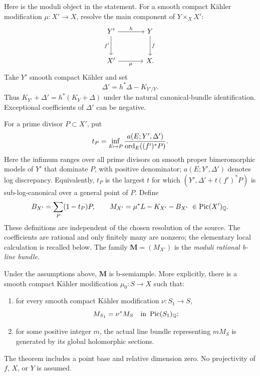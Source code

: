 Here is the moduli object in the statement.
For a smooth compact K\"ahler modification \(\mu:X'\to X\), resolve
the main component of \(Y\times_X X'\):
\[
\begin{tikzcd}[column sep=large,row sep=large]
 Y' \arrow[r,"h"] \arrow[d,"f'"'] & Y\arrow[d,"f"]\\
 X' \arrow[r,"\mu"'] & X .
\end{tikzcd}
\]
Take \(Y'\) smooth compact K\"ahler and set
\[
 \Delta'=h^*\Delta-K_{Y'/Y}.
\]
Thus \(K_{Y'}+\Delta'=h^*(K_Y+\Delta)\) under the natural
canonical-bundle identification. Exceptional coefficients of
\(\Delta'\) can be negative.

For a prime divisor \(P\subset X'\), put
\begin{equation}\label{eq:threshold}
 t_P=\inf_{E\mapsto P}
 \frac{a(E;Y',\Delta')}{\operatorname{ord}_E((f')^*P)}.
\end{equation}
Here the infimum ranges over all prime divisors on smooth proper
bimeromorphic models of \(Y'\) that dominate \(P\), with positive
denominator; \(a(E;Y',\Delta')\) denotes log discrepancy.
Equivalently, \(t_P\) is the largest \(t\) for which
\((Y',\Delta'+t(f')^*P)\) is sub-log-canonical over a general point of
\(P\). Define
\begin{equation}\label{eq:moduli}
 B_{X'}=\sum_P(1-t_P)P,\qquad
 M_{X'}=\mu^*L-K_{X'}-B_{X'}\ \in\operatorname{Pic}(X')_{\mathbb Q}.
\end{equation}
These definitions are independent of the chosen resolution of the
source. The coefficients are rational and only finitely many are
nonzero; the elementary local calculation is recalled below.
The family \(\mathbf M=(M_{X'})\) is the \emph{moduli rational
b-line bundle}.

\begin{theorem}\label{thm:main}
Under the assumptions above, \(\mathbf M\) is b-semiample.
More explicitly, there is a smooth compact K\"ahler modification
\(\mu_0:S\to X\) such that:
\begin{enumerate}[label=\textup{(\alph*)}]
\item for every smooth compact K\"ahler modification \(\nu:S_1\to S\),
\[
 M_{S_1}=\nu^*M_S\quad\text{in }\operatorname{Pic}(S_1)_{\mathbb Q};
\]
\item for some positive integer \(m\), the actual line bundle
representing \(mM_S\) is generated by its global holomorphic sections.
\end{enumerate}
The theorem includes a point base and relative dimension zero.
No projectivity of \(f\), \(X\), or \(Y\) is assumed.
\end{theorem}

